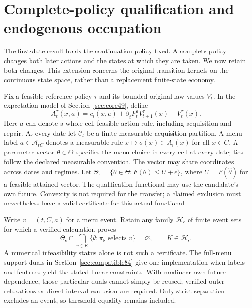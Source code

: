 \section{Complete-policy qualification and endogenous occupation}\label{sec:recursive86}
The first-date result holds the continuation policy fixed. A complete policy changes both later actions and the states at which they are taken. We now retain both changes. This extension concerns the original transition kernels on the continuous state space, rather than a replacement finite-state economy.

Fix a feasible reference policy $\tau$ and its bounded original-law values $V_t^\tau$. In the expectation model of Section~\ref{sec:core49}, define
\begin{equation}\label{eq:advantage86}
 A_t^\tau(x,a)=c_t(x,a)+\beta_tP_t^aV_{t+1}^\tau(x)-V_t^\tau(x).
\end{equation}
Here $a$ can denote a whole-cell feasible action rule, including acquisition and repair. At every date let $\mathcal C_t$ be a finite measurable acquisition partition. A menu label $a\in\mathcal A_{tC}$ denotes a measurable rule $x\mapsto a(x)\in A_t(x)$ for all $x\in C$. A parameter vector $\theta\in\Theta$ specifies the menu choice in every cell at every date; ties follow the declared measurable convention. The vector may share coordinates across dates and regimes. Let $\Theta_\epsilon=\{\theta\in\Theta:F(\theta)\le U+\epsilon\}$, where $U=F(\widehat\theta)$ for a feasible attained vector. The qualification functional may use the candidate's own future. Convexity is not required for the transfer; a claimed exclusion must nevertheless have a valid certificate for this actual functional.

Write $v=(t,C,a)$ for a menu event. Retain any family $\mathcal H_\epsilon$ of finite event sets for which a verified calculation proves
\begin{equation}\label{eq:conflict86}
 \Theta_\epsilon\cap\bigcap_{v\in K}\{\theta:\pi_\theta\text{ selects }v\}=\varnothing,
 \qquad K\in\mathcal H_\epsilon.
\end{equation}
A numerical infeasibility status alone is not such a certificate. The full-menu support duals in Section~\ref{sec:compatible84} give one implementation when labels and features yield the stated linear constraints. With nonlinear own-future dependence, those particular duals cannot simply be reused; verified outer relaxations or direct interval exclusion are required. Only strict separation excludes an event, so threshold equality remains included.

